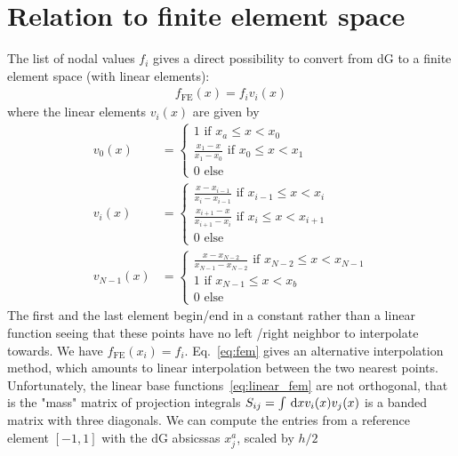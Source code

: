 \section{Relation to finite element space}
The list of nodal values $f_i$ gives a direct possibility to convert from dG to a finite element space (with linear elements):
\begin{align} \label{eq:fem}
    f_{\text{FE}}(x) = f_{i} v_{i}(x)
\end{align}
where the linear elements $v_i(x)$ are given by
\begin{align}\label{eq:linear_fem}
    v_0(x) &= \begin{cases}
        1 \text{ if } x_{a}\leq x<x_{0} \\
        \frac{x_{1} - x}{x_{1} - x_{0}} \text{ if } x_{0}\leq x<x_{1} \\
         0 \text{ else}
    \end{cases}
    \\
    v_{i}(x) &= \begin{cases}
        \frac{x - x_{i-1} }{x_{i} - x_{i-1}} \text{ if } x_{i-1}\leq x<x_{i} \\
        \frac{x_{i+1} - x}{x_{i+1} - x_{i}} \text{ if } x_{i}\leq x<x_{i+1} \\
         0 \text{ else}
    \end{cases}
    \\
    v_{N-1}(x) &= \begin{cases}
        \frac{x - x_{N-2} }{x_{N-1} - x_{N-2}} \text{ if } x_{N-2}\leq x<x_{N-1} \\
        1 \text{ if } x_{N-1}\leq x<x_{b} \\
         0 \text{ else}
    \end{cases}
\end{align}
The first and the last element begin/end in a constant rather than a linear function
seeing that these points have no left /right neighbor to interpolate towards.
We have $f_{\text{FE}}(x_{i}) = f_{i}$. Eq.~\eqref{eq:fem} gives an alternative
interpolation method, which amounts to linear interpolation between the two nearest
points. Unfortunately, the linear base functions~\eqref{eq:linear_fem} are not
orthogonal, that is the "mass" matrix of projection integrals $S_{ij} = \int \,\mathrm{d}x v_i(x)v_j(x)$ is a banded matrix with three diagonals.
We can compute the entries from a reference element $[-1,1]$
with the dG absicssas $x_j^a$, scaled by $h/2$
